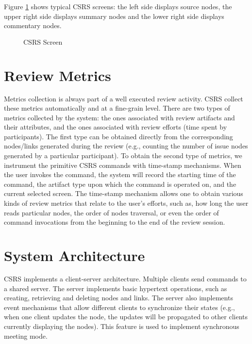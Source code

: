 Figure \ref{fig:csrs-screen} shows typical CSRS screens: the left
side displays source nodes, the upper right side displays summary
nodes and the lower right side displays commentary nodes.

\begin{figure}[h]
  \begin{center}
  \end{center}
  \caption{CSRS Screen}
  \label{fig:csrs-screen}
\end{figure}

\section{Review Metrics}
Metrics collection is always part of a well executed review activity.
CSRS collect these metrics automatically and at a
fine-grain level. There are two types of metrics collected by
the system: the ones associated with review artifacts and their
attributes, and the ones associated with review efforts (time spent by
participants).  The first type can be obtained directly
from the corresponding nodes/links generated during the review
(e.g., counting the number of issue nodes generated by a
particular participant). To obtain the second type of metrics, we
instrument the primitive CSRS commands with time-stamp
mechanisms. When the user 
invokes the command, the system will record the starting time of the
command, the artifact type upon which the command is operated on, and the
current selected screen. 
The time-stamp mechanism allows one to obtain various kinds of
review metrics that relate to the user's efforts, such as, how long the
user reads particular nodes, the order of nodes traversal,
or even the order of command invocations from the beginning to
the end of the review session.

\section{System Architecture}
CSRS implements a client-server architecture. Multiple clients send
commands to a shared server. 
The server implements basic hypertext operations,
such as creating, retrieving and deleting nodes and links.
The server also implements event mechanisms
that allow different clients to synchronize their states (e.g., when one
client updates the node, the updates will be propagated to other clients
currently displaying the nodes). This  feature is used to
implement synchronous meeting mode.


